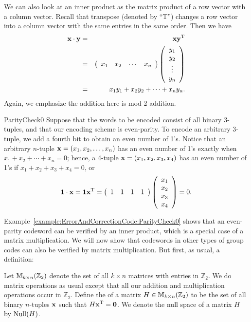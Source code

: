 We can also look at an inner product as the matrix product of a row vector with a column vector. Recall that transpose (denoted by ``T'') changes a row vector into a column vector with the same entries in the same order.
Then we have
\begin{eqnarray*}
{\bold x} \cdot {\bold y} & = & {\bold x}  {\bold y}^{\rm T}
\\
& = &
\left(
\begin{array}{cccc}
x_1 & x_2 & \cdots & x_n
\end{array}
\right)
\left(
\begin{array}{c}
y_1 \\
y_2 \\
\vdots \\
y_n
\end{array}
\right) \\
& = &
x_{1}y_{1} + x_{2}y_{2} + \cdots + x_{n}y_{n}.
\end{eqnarray*}
Again, we emphasize the addition here is mod 2 addition. 

\begin{example}{ParityCheck0}
Suppose that the words to be encoded consist of all binary
3-tuples, 
and that our encoding scheme is even-parity. To encode an arbitrary
3-tuple, we add a fourth bit to obtain an even number of 1's. Notice
that an arbitrary $n$-tuple ${\bold x} = (x_1, x_2, \ldots, x_n)$ has an even number of 1's exactly when $x_1 + x_2 + \cdots + x_n =
0$; hence, a 4-tuple ${\bold x} = (x_1, x_2, x_3, x_4)$ has an
even number of 1's if $ x_1+ x_2+ x_3+ x_4 = 0$, or 
\[
{\bold 1} \cdot {\bold x} 
= 
{\bold 1} {\bold x}^{\rm T} 
=
\left(
\begin{array}{cccc}
1 & 1 & 1 & 1
\end{array}
\right)
\left(
\begin{array}{c}
x_1 \\
x_2 \\
x_3 \\
x_4
\end{array}
\right) = 0.
\]
\end{example} 
Example~\ref{example:ErrorAndCorrectionCode:ParityCheck0} shows that an even-parity codeword can be verified by an inner product, which is a special case of a matrix multiplication. We will now show that codewords in other types of group codes can also be verified by matrix multiplication. But first, as usual, a definition:

\begin{defn} 
Let ${\Bbb M}_{k \times n}(\mathbb{Z}_2)$ denote the set
of all $k \times n$ matrices with entries in $\mathbb{Z}_2$. We do
matrix operations as usual except that all our addition and multiplication
operations occur in $\mathbb{Z}_2$. Define the  of 
a matrix $H \in {\Bbb M}_{k \times n}(\mathbb{Z}_2)$ to be the set of
all binary $n$-tuples ${\bold x}$ such that $H{\bold x}^{\rm T} = {\bold 0}$.
We denote the null space of a matrix $H$ by ${\rm Null}(H)$.  
\end{defn} 
 
